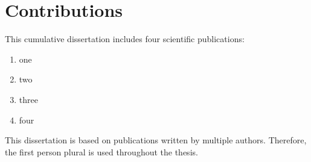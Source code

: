 \chapter*{Contributions}

This cumulative dissertation includes four scientific publications:

\begin{enumerate}
    \item one
    \item two
    \item three
    \item four
\end{enumerate}

This dissertation is based on publications written by multiple authors. 
Therefore, the first person plural is used throughout the thesis.
